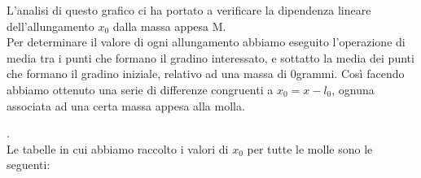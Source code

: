 \documentclass[a4paper]{article}
\theoremstyle{definition}
\begin{document}
		L'analisi di questo grafico ci ha portato a verificare la dipendenza lineare dell'allungamento \(x_{0}\) dalla massa appesa M.\\
		Per determinare il valore di ogni allungamento abbiamo eseguito l'operazione di media tra i punti che formano il gradino interessato, e sottatto la media dei punti che formano il gradino iniziale, relativo ad una massa di 0grammi. Così facendo abbiamo ottenuto una serie di differenze congruenti a \(x_{0} = x - l_{0}\), ognuna associata ad una certa massa appesa alla molla.\\
		\begin{figure}[!htbp]
		\end{figure}
		.\\
		
		
		
			\noindent Le tabelle in cui abbiamo raccolto i valori di \(x_{0}\) per tutte le molle sono le seguenti:
		
\end{document}
